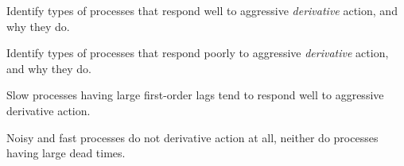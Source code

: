 

Identify types of processes that respond well to aggressive {\it derivative} action, and why they do.

\vskip 200pt

Identify types of processes that respond poorly to aggressive {\it derivative} action, and why they do.

\vfil

\eject






Slow processes having large first-order lags tend to respond well to aggressive derivative action.

\vskip 10pt

Noisy and fast processes do not derivative action at all, neither do processes having large dead times.











